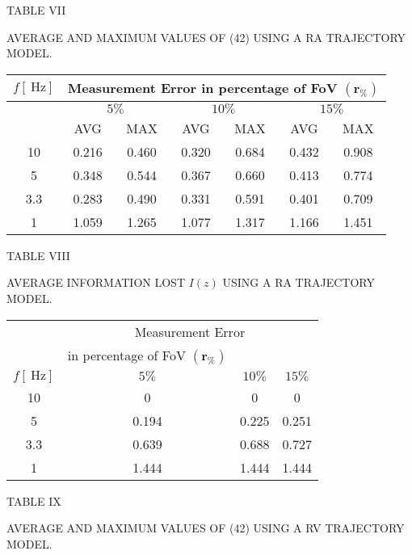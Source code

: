 \documentclass[conference]{IEEEtran}
\begin{document}
TABLE VII

AVERAGE AND MAXIMUM VALUES OF (42) USING A RA TRAJECTORY MODEL.

\begin{center}
\begin{tabular}{|c|c|c|c|c|c|c|}
\hline
\multirow[b]{3}{*}{$f[\mathrm{~Hz}]$} & \multicolumn{6}{|c|}{Measurement Error in percentage of FoV $\left(\mathbf{r}_{\%}\right)$} \\
\hline
 & \multicolumn{2}{|c|}{$5 \%$} & \multicolumn{2}{|c|}{$10 \%$} & \multicolumn{2}{|c|}{$15 \%$} \\
\hline
 & AVG & MAX & AVG & MAX & AVG & MAX \\
\hline
10 & 0.216 & 0.460 & 0.320 & 0.684 & 0.432 & 0.908 \\
\hline
5 & 0.348 & 0.544 & 0.367 & 0.660 & 0.413 & 0.774 \\
\hline
3.3 & 0.283 & 0.490 & 0.331 & 0.591 & 0.401 & 0.709 \\
\hline
1 & 1.059 & 1.265 & 1.077 & 1.317 & 1.166 & 1.451 \\
\hline
\end{tabular}
\end{center}

TABLE VIII

AVERAGE INFORMATION LOST $I(z)$ USING A RA TRAJECTORY MODEL.

\begin{center}
\begin{tabular}{cccc}
\hline
 & \multicolumn{4}{c}{Measurement Error} \\
 & in percentage of FoV $\left(\mathbf{r}_{\%}\right)$ &  &  &  \\
$f[\mathrm{~Hz}]$ & $5 \%$ & $10 \%$ & $15 \%$ &  \\
\hline
10 & 0 & 0 & 0 &  \\
5 & 0.194 & 0.225 & 0.251 &  \\
3.3 & 0.639 & 0.688 & 0.727 &  \\
1 & 1.444 & 1.444 & 1.444 &  \\
\end{tabular}
\end{center}

TABLE IX

AVERAGE AND MAXIMUM VALUES OF (42) USING A RV TRAJECTORY MODEL.
\end{document}
